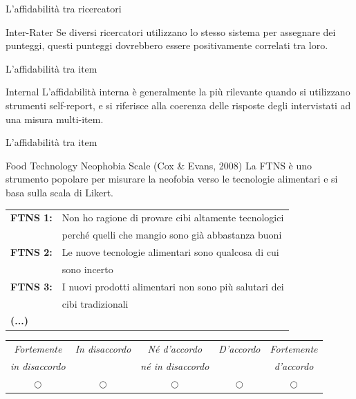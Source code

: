 \documentclass{beamer}
\begin{document}
\begin{frame}{L'affidabilità tra ricercatori}
    \begin{block}{Inter-Rater}
        Se diversi ricercatori utilizzano lo stesso sistema per assegnare dei punteggi, questi punteggi dovrebbero essere positivamente correlati tra loro.
    \end{block}
\end{frame}

\begin{frame}{L'affidabilità tra item}
    \begin{block}{Internal}
        L'affidabilità interna è generalmente la più rilevante quando si utilizzano strumenti self-report, e si riferisce alla coerenza delle risposte degli intervistati ad una misura multi-item.
    \end{block}
\end{frame}

\begin{frame}{L'affidabilità tra item}
  \begin{block}{Food Technology Neophobia Scale (Cox \& Evans, 2008)}
    La FTNS è uno strumento popolare per misurare la neofobia verso le tecnologie alimentari e si basa sulla scala di Likert.
  \end{block}
  \vspace{0.3cm}
  \small
  \begin{tabular}{l l}
    \textbf{FTNS 1:} & Non ho ragione di provare cibi altamente tecnologici \\
    & perché quelli che mangio sono già abbastanza buoni \\
    \textbf{FTNS 2:} & Le nuove tecnologie alimentari sono qualcosa di cui \\
    & sono incerto \\
    \textbf{FTNS 3:} & I nuovi prodotti alimentari non sono più salutari dei \\ 
    & cibi tradizionali \\
    \textbf{(...)}
  \end{tabular}
  \vspace{0.2cm}
  \begin{center}
    \footnotesize
    \begin{tabular}{ccccc}
      \toprule
      \textit{Fortemente} & \textit{In disaccordo} & \textit{Né d'accordo} & \textit{D'accordo} & \textit{Fortemente} \\
      \textit{in disaccordo} &  & \textit{né in disaccordo} &  & \textit{d'accordo} \\
      \midrule
      $\bigcirc$ & $\bigcirc$ & $\bigcirc$ & $\bigcirc$ & $\bigcirc$ \\
      \bottomrule
    \end{tabular}
  \end{center}
\end{frame}
\end{document}
